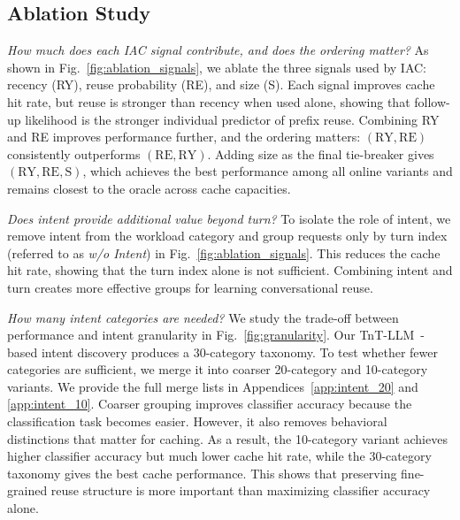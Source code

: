 \documentclass{article}
\newcommand{\bo}[1]{\textcolor{red}{[Bo: #1]}}
\begin{document}
\subsection{Ablation Study}
\label{sec:ablation}

\vspace{-5pt}

\textit{How much does each IAC signal contribute, and does the ordering matter?} As shown in Fig.~\ref{fig:ablation_signals}, we ablate the three signals used by IAC: recency (RY), reuse probability (RE), and size (S). Each signal improves cache hit rate, but reuse is stronger than recency when used alone, showing that follow-up likelihood is the stronger individual predictor of prefix reuse. Combining RY and RE improves performance further, and the ordering matters: $(\mathrm{RY},\mathrm{RE})$ consistently outperforms $(\mathrm{RE},\mathrm{RY})$.
Adding size as the final tie-breaker gives $(\mathrm{RY},\mathrm{RE},\mathrm{S})$, which achieves the best performance among all online variants and remains closest to the oracle across cache capacities.

\textit{Does intent provide additional value beyond turn?} 
To isolate the role of intent, we remove intent from the workload category and group requests only by turn index (referred to as \textit{w/o Intent}) in Fig.~\ref{fig:ablation_signals}. This reduces the cache hit rate, showing that the turn index alone is not sufficient. Combining intent and turn creates more effective groups for learning conversational reuse.




\textit{How many intent categories are needed?} We study the trade-off between performance and intent granularity in Fig.~\ref{fig:granularity}. Our TnT-LLM~\cite{10.1145/3637528.3671647}-based intent discovery produces a 30-category taxonomy. To test whether fewer categories are sufficient, we merge it into coarser 20-category and 10-category variants. We provide the full merge lists in Appendices~\ref{app:intent_20} and \ref{app:intent_10}. Coarser grouping improves classifier accuracy because the classification task becomes easier. However, it also removes behavioral distinctions that matter for caching. As a result, the 10-category variant achieves higher classifier accuracy but much lower cache hit rate, while the 30-category taxonomy gives the best cache performance. This shows that preserving fine-grained reuse structure is more important than maximizing classifier accuracy alone.
\end{document}
